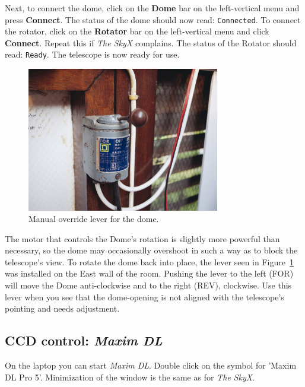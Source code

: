 \documentclass[12pt,twoside,a4paper]{report}
\begin{document}
Next, to connect the dome, click on the \textbf{Dome} bar on the left-vertical menu and press 
\textbf{Connect}. The status of the dome should now read: \textcolor{PineGreen}{\tt Connected}.
To connect the rotator, click on the \textbf{Rotator} bar on the left-vertical menu and 
click \textbf{Connect}. Repeat this if \emph{The SkyX} complains.  The status of the Rotator should 
read: \textcolor{PineGreen}{\tt Ready}. The telescope is now ready for use.\\

\begin{figure}[ht]
 \centering
    \includegraphics[width=0.75\textwidth]{documentation_images/dome_control.jpg}
    \caption{\label{fig:dome_control}Manual override lever for the dome.}
\end{figure}

The motor that controls the Dome's rotation is slightly more powerful than necessary, so the dome may occasionally overshoot in such a way as to block the telescope's view. To rotate the dome back into place, the lever seen in Figure~\ref{fig:dome_control} was installed on the East wall of the room. Pushing the lever to the left (FOR) will move the Dome anti-clockwise and to the right (REV), clockwise. Use this lever when you see that the dome-opening is not aligned with the telescope's pointing and needs adjustment.\\


\subsection{CCD control: \emph{Maxim DL}}

On the laptop you can start \emph{Maxim DL}. Double click on the symbol for 'Maxim DL Pro 5'. 
Minimization of the window is the same as for \emph{The SkyX}.\\
\end{document}
